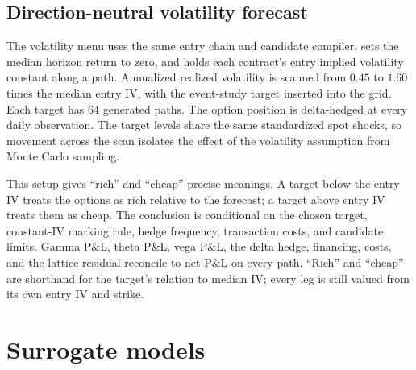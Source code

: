 \documentclass{strategynet-journal}
\begin{document}
\subsection{Direction-neutral volatility forecast}

The volatility menu uses the same entry chain and candidate compiler, sets
the median horizon return to zero, and holds each contract's entry implied
volatility constant along a path.  Annualized realized volatility is scanned
from \(0.45\) to \(1.60\) times the median entry IV, with the event-study
target inserted into the grid.  Each target has 64 generated paths.  The
option position is delta-hedged at every daily observation.  The target
levels share the same standardized spot shocks, so movement across the scan
isolates the effect of the volatility assumption from Monte Carlo sampling.

This setup gives ``rich'' and ``cheap'' precise meanings.  A target below the
entry IV treats the options as rich relative to the forecast; a target above
entry IV treats them as cheap.  The conclusion is conditional on the chosen
target, constant-IV marking rule, hedge frequency, transaction costs, and
candidate limits.  Gamma P\&L, theta P\&L, vega P\&L, the delta hedge,
financing, costs, and the lattice residual reconcile to net P\&L on every
path.  ``Rich'' and ``cheap'' are shorthand for the target's relation to
median IV; every leg is still valued from its own entry IV and strike.

\section{Surrogate models}
\end{document}
